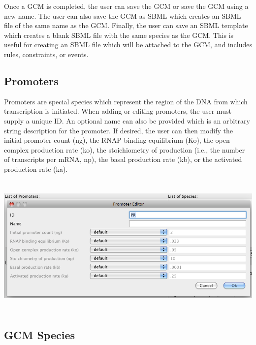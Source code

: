 \documentclass[titlepage,11pt]{article}
\begin{document}
Once a GCM is completed, the user can save the GCM or save the GCM 
using a new name.  The user can also save the GCM as SBML which creates
an SBML file of the same name as the GCM.  Finally, the user can save
an SBML template which creates a blank SBML file with the same species 
as the GCM.  This is useful for creating an SBML file which will be 
attached to the GCM, and includes rules, constraints, or events.

\subsection{\label{Promoters}Promoters}

\noindent
Promoters are special species which represent the region of the DNA
from which transcription is initiated.  
When adding or editing promoters, the user must supply a unique ID.  
An optional name can also be provided which is an arbitrary string
description for the promoter. 
If desired, the user can then modify the initial promoter count (ng), 
the RNAP binding equilibrium (Ko), 
the open complex production rate (ko), 
the stoichiometry of production (i.e., the number of transcripts 
per mRNA, np), the basal production rate (kb), or
the activated production rate (ka). 
\begin{center}
\includegraphics[height=70mm]{screenshots/promoter}
\end{center}

\subsection{\label{GCMSpecies}GCM Species}
\end{document}
